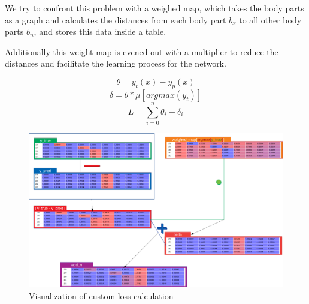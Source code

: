 We try to confront this problem with a weighed map, which takes the body parts as a graph and calculates
the distances from each body part $b_x$ to all other body parts $b_n$, and stores this data inside a table.

Additionally this weight map is evened out with a multiplier to reduce the distances and facilitate
the learning process for the network.

$$\theta=y_t(x)-y_p(x)$$
$$\delta=\theta*\mu[argmax(y_t)] $$
$$L=\sum_{i=0}^{n}\theta_i+\delta_i$$


\begin{figure}[H]
    \centering
    \includegraphics[width=\textwidth,height=\textheight,keepaspectratio]{img/loss_calculation.png}
    \decoRule
    \caption[CILoss]{Visualization of custom loss calculation}
    \label{fig:ciloss-calc}
\end{figure}
